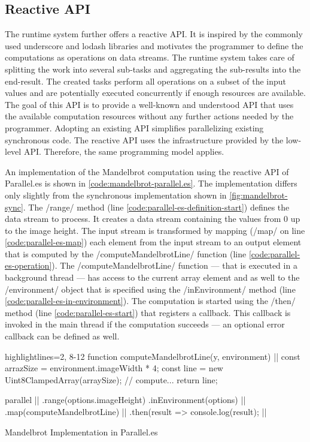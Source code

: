\subsection{Reactive API}
The runtime system further offers a reactive API. It is inspired by the commonly used underscore and lodash libraries and motivates the programmer to define the computations as operations on data streams. The runtime system takes care of splitting the work into several sub-tasks and aggregating the sub-results into the end-result. The created tasks perform all operations on a subset of the input values and are potentially executed concurrently if enough resources are available. The goal of this API is to provide a well-known and understood API that uses the available computation resources without any further actions needed by the programmer. Adopting an existing API simplifies parallelizing existing synchronous code. The reactive API uses the infrastructure provided by the low-level API. Therefore, the same programming model applies.


 An implementation of the Mandelbrot computation using the reactive API of Parallel.es is shown in \cref{code:mandelbrot-parallel.es}. The implementation differs only slightly from the synchronous implementation shown in \cref{fig:mandelbrot-sync}. The \javascriptinline/range/ method (line \ref{code:parallel-es-definition-start}) defines the data stream to process. It creates a data stream containing the values from 0 up to the image height. The input stream is transformed by mapping (\javascriptinline/map/ on line \ref{code:parallel-es-map}) each element from the input stream to an output element that is computed by the \javascriptinline/computeMandelbrotLine/ function (line \ref{code:parallel-es-operation}). The \javascriptinline/computeMandelbrotLine/ function --- that is executed in a background thread --- has access to the current array element and as well to the \javascriptinline/environment/ object that is specified using the \javascriptinline/inEnvironment/ method (line \ref{code:parallel-es-in-environment}). The computation is started using the \javascriptinline/then/ method (line \ref{code:parallel-es-start}) that registers a callback. This callback is invoked in the main thread if the computation succeeds — an optional error callback can be defined as well.
 
\begin{listing}
	\begin{javascriptcode*}{highlightlines={2, 8-12}}
function computeMandelbrotLine(y, environment) { |$\label{code:parallel-es-operation}$|
	const arrazSize = environment.imageWidth * 4;
	const line = new Uint8ClampedArray(arraySize);
	// compute...
	return line;
}

parallel      |$\label{code:parallel-es-definition-start}$|
	.range(options.imageHeight)
	.inEnvironment(options) |$\label{code:parallel-es-in-environment}$|
	.map(computeMandelbrotLine) |$\label{code:parallel-es-map}$|
	.then(result => console.log(result); |$\label{code:parallel-es-start}$|
	\end{javascriptcode*}
	
	\caption{Mandelbrot Implementation in Parallel.es}
	\label{code:mandelbrot-parallel.es}
\end{listing}


